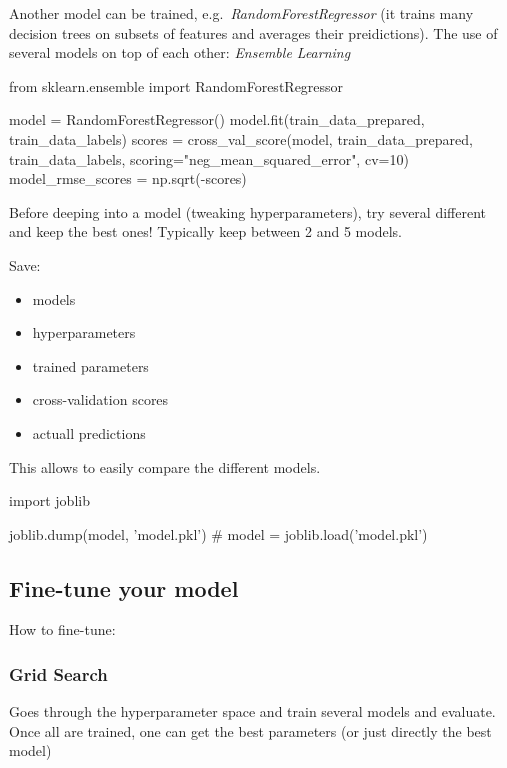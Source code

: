     Another model can be trained, e.g.\ \emph{RandomForestRegressor} (it trains many decision trees on subsets of features and averages their preidictions).
    The use of several models on top of each other: \emph{Ensemble Learning}
    \begin{python}
        from sklearn.ensemble import RandomForestRegressor

        model = RandomForestRegressor()
        model.fit(train_data_prepared, train_data_labels)
        scores = cross_val_score(model, train_data_prepared, train_data_labels,
                    scoring="neg_mean_squared_error", cv=10)
        model_rmse_scores = np.sqrt(-scores)
    \end{python}

    Before deeping into a model (tweaking hyperparameters), try several different and keep the best ones!
    Typically keep between 2 and 5 models.

    Save:
    \begin{itemize}
        \item models
        \item hyperparameters
        \item trained parameters
        \item cross-validation scores
        \item actuall predictions
    \end{itemize}
    This allows to easily compare the different models.
    \begin{python}
        import joblib

        joblib.dump(model, 'model.pkl')
        # model = joblib.load('model.pkl')
    \end{python}

    \subsection{Fine-tune your model}
    How to fine-tune:
    \subsubsection*{Grid Search}
    Goes through the hyperparameter space and train several models and evaluate.
    Once all are trained, one can get the best parameters (or just directly the best model)

